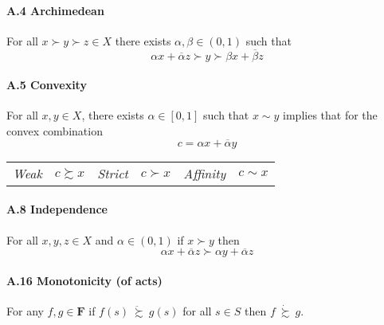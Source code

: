 \documentclass[14pt]{extarticle}
\newcommand{\dsuccsim}{\ \dot \succsim \ }
\newcommand{\ddsuccsim}{\ \ddot \succsim \ }
\begin{document}
\paragraph{A.4 Archimedean}
For all $x \succ y \succ z \in X$ there exists $\alpha, \beta \in (0, 1)$ such that
\[
	\alpha x + \overline \alpha z \succ y \succ \beta x + \overline \beta z
\]

\paragraph{A.5 Convexity}
For all $x, y \in X$, there exists $\alpha \in [0, 1]$ such that $x \sim y$ implies
that for the convex combination
\[
	c = \alpha x + \overline \alpha y
\]
\begin{center}
	\begin{tabular}{cc|cc|cc}
		\textit{Weak}     & $c \succsim x$ &
		\textit{Strict}   & $c \succ x$    &
		\textit{Affinity} & $c \sim x$       \\
	\end{tabular}
\end{center}

\paragraph{A.8 Independence}
For all $x, y, z \in X$ and $\alpha \in (0,1)$
if $x \succ y$ then
\[
	\alpha x + \overline \alpha z \succ \alpha y + \overline \alpha z
\]

\paragraph{A.16 Monotonicity (of acts)}
For any $f, g \in \bm F$ if $f(s) \ddsuccsim g(s)$ for all $s \in S$
then $f \dsuccsim g$.
\end{document}
